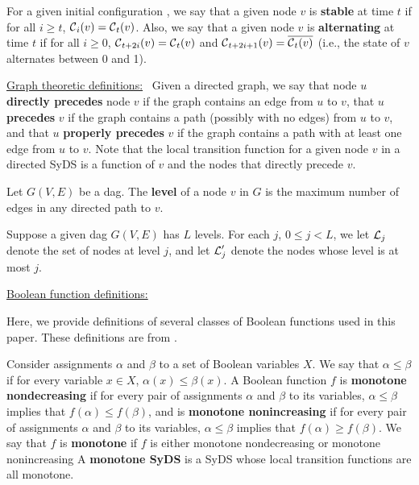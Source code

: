 For a given initial configuration \calc{},
we  say that a given node $v$ is \textbf{stable} at time $t$ if
for all $i \geq t$, $\mbox{$\mathcal{C}$}_i(v)= \mbox{$\mathcal{C}$}_t(v)$.
Also, we say that a given node $v$ is \textbf{alternating} at time $t$ if
for all $i \geq 0$, 
$\mbox{$\mathcal{C}$}_{t+2i}(v) =  \mbox{$\mathcal{C}$}_t(v)$ 
and $\mbox{$\mathcal{C}$}_{t+2i+1}(v) = \overline{ \mbox{$\mathcal{C}$}_t(v)}$ 
(i.e., the state of $v$ alternates between 0 and 1).  


\smallskip
\noindent
\underline{\textsf{Graph theoretic definitions:}}~
Given a directed graph, we say that node $u$ {\bf directly precedes}
node $v$ if the graph contains an edge from $u$ to $v$,
that $u$ {\bf precedes} $v$ if the graph contains a path (possibly
with no edges) from $u$ to $v$,
and that $u$ {\bf properly precedes} $v$
if the graph contains a path with at least one edge  from $u$ to $v$.
Note that the local transition function for a given node $v$  in a
directed SyDS is a function of $v$
and the nodes that directly precede $v$.

\begin{definition}\label{def:dag_level}
Let $G(V,E)$ be a dag.
The \textbf{level} of a node $v$  in $G$ is the maximum number
of edges in any directed path to $v$.
\end{definition}

Suppose a given dag $G(V,E)$ has $L$ levels. 
For each $j$, $0 \leq j < L$, we let $\mbox{$\mathcal{L}$}_j$ denote the set of nodes at level $j$,
and let $\mbox{$\mathcal{L}$}_j'$ denote the nodes whose level is at most $j$.

\smallskip
\noindent
\underline{\textsf{Boolean function definitions:}}~
\iffalse
A {\bf linear} Boolean function is one that can be expressed as a
linear equation mod 2 of its variables, i.e., the xor or complement
of the xor of its variables.  A {\bf linear SyDS} is a SyDS whose
local transition functions are all linear.
\fi
Here, we provide definitions of several classes of
Boolean functions used in this paper.
These definitions are from \cite{Crama-Hammer-2011,BH+06}.  

Consider assignments $\alpha$ and $\beta$
to a set of Boolean variables $X$.  We say that $\alpha \leq \beta$
if for every variable $x \in X$, $\alpha(x) \leq \beta(x)$.  A
Boolean function $f$  is {\bf monotone nondecreasing} if for every
pair of assignments $\alpha$ and $\beta$ to its variables, $\alpha
\leq \beta$ implies that $f(\alpha) \leq f(\beta)$, and is {\bf
monotone nonincreasing} if for every pair of assignments $\alpha$
and $\beta$ to its variables, $\alpha \leq \beta$ implies that
$f(\alpha) \geq f(\beta)$.  We say that $f$ is {\bf monotone} if
$f$ is either monotone nondecreasing or monotone nonincreasing A
{\bf monotone SyDS} is a SyDS whose local transition functions are
all monotone.

